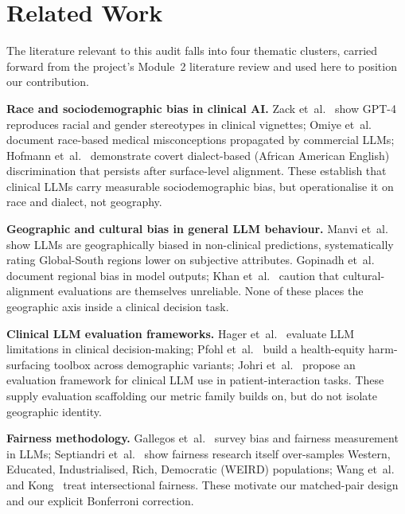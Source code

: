 \documentclass[11pt,a4paper]{article}
\begin{document}
\section{Related Work}
\label{sec:related}

The literature relevant to this audit falls into four thematic clusters,
carried forward from the project's Module~2 literature review and used here to
position our contribution.

\textbf{Race and sociodemographic bias in clinical AI.} Zack
et~al.~\cite{zack2024} show GPT-4 reproduces racial and gender stereotypes in
clinical vignettes; Omiye et~al.~\cite{omiye2023} document race-based medical
misconceptions propagated by commercial LLMs; Hofmann
et~al.~\cite{hofmann2024} demonstrate covert dialect-based (African American
English) discrimination that persists after surface-level alignment. These
establish that clinical LLMs carry measurable sociodemographic bias, but
operationalise it on race and dialect, not geography.

\textbf{Geographic and cultural bias in general LLM behaviour.} Manvi
et~al.~\cite{manvi2024} show LLMs are geographically biased in
non-clinical predictions, systematically rating Global-South regions lower on
subjective attributes. Gopinadh et~al.~\cite{gopinadh2026} document regional
bias in model outputs; Khan et~al.~\cite{khan2025} caution that cultural-
alignment evaluations are themselves unreliable. None of these places the
geographic axis inside a clinical decision task.

\textbf{Clinical LLM evaluation frameworks.} Hager et~al.~\cite{hager2024}
evaluate LLM limitations in clinical decision-making; Pfohl
et~al.~\cite{pfohl2024} build a health-equity harm-surfacing toolbox across
demographic variants; Johri et~al.~\cite{johri2025} propose an evaluation
framework for clinical LLM use in patient-interaction tasks. These supply
evaluation scaffolding our metric family builds on, but do not isolate
geographic identity.

\textbf{Fairness methodology.} Gallegos et~al.~\cite{gallegos2024} survey
bias and fairness measurement in LLMs; Septiandri
et~al.~\cite{septiandri2023} show fairness research itself over-samples
Western, Educated, Industrialised, Rich, Democratic (WEIRD) populations; Wang
et~al.~\cite{wang2022} and Kong~\cite{kong2022} treat intersectional fairness.
These motivate our matched-pair design and our explicit Bonferroni correction.
\end{document}
